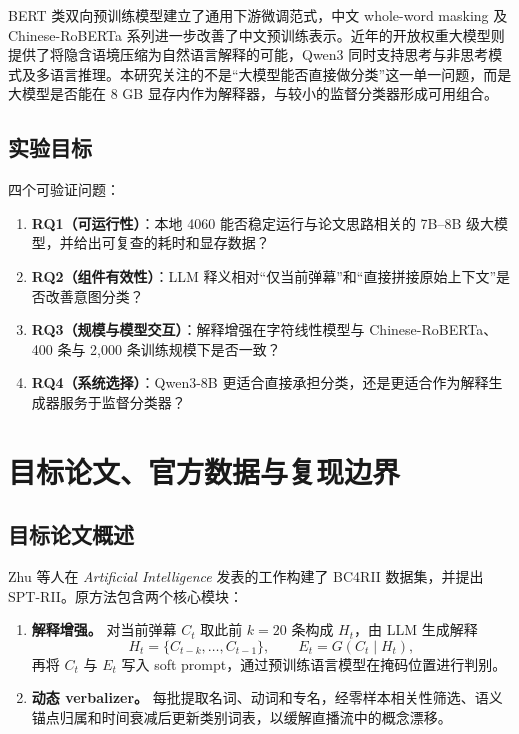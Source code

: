 \documentclass[UTF8,zihao=-4,a4paper]{ctexart}
\begin{document}
BERT 类双向预训练模型建立了通用下游微调范式\cite{devlin2019bert}，中文 whole-word masking 及 Chinese-RoBERTa 系列进一步改善了中文预训练表示\cite{cui2020revisiting,cui2021wholeword}。近年的开放权重大模型则提供了将隐含语境压缩为自然语言解释的可能，Qwen3 同时支持思考与非思考模式及多语言推理\cite{yang2025qwen3}。本研究关注的不是“大模型能否直接做分类”这一单一问题，而是大模型是否能在 8 GB 显存内作为解释器，与较小的监督分类器形成可用组合。

\subsection{实验目标}

四个可验证问题：

\begin{enumerate}[leftmargin=2em]
  \item \textbf{RQ1（可运行性）}：本地 4060 能否稳定运行与论文思路相关的 7B--8B 级大模型，并给出可复查的耗时和显存数据？
  \item \textbf{RQ2（组件有效性）}：LLM 释义相对“仅当前弹幕”和“直接拼接原始上下文”是否改善意图分类？
  \item \textbf{RQ3（规模与模型交互）}：解释增强在字符线性模型与 Chinese-RoBERTa、400 条与 2,000 条训练规模下是否一致？
  \item \textbf{RQ4（系统选择）}：Qwen3-8B 更适合直接承担分类，还是更适合作为解释生成器服务于监督分类器？
\end{enumerate}

\section{目标论文、官方数据与复现边界}

\subsection{目标论文概述}

Zhu 等人在 \textit{Artificial Intelligence} 发表的工作构建了 BC4RII 数据集，并提出 SPT-RII\cite{zhu2026bc4rii}。原方法包含两个核心模块：

\begin{enumerate}[leftmargin=2em]
  \item \textbf{解释增强。} 对当前弹幕 $C_t$ 取此前 $k=20$ 条构成 $H_t$，由 LLM 生成解释
  \begin{equation}
    H_t=\{C_{t-k},\ldots,C_{t-1}\}, \qquad E_t=G(C_t\mid H_t),
  \end{equation}
  再将 $C_t$ 与 $E_t$ 写入 soft prompt，通过预训练语言模型在掩码位置进行判别。
  \item \textbf{动态 verbalizer。} 每批提取名词、动词和专名，经零样本相关性筛选、语义锚点归属和时间衰减后更新类别词表，以缓解直播流中的概念漂移。
\end{enumerate}
\end{document}
